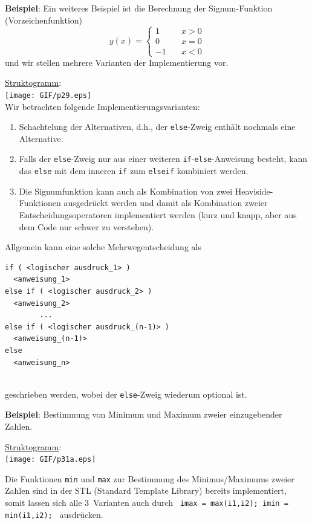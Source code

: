 \textbf{Beispiel}: Ein weiteres Beispiel ist die Berechnung
der Signum-Funktion (Vorzeichenfunktion)
$$
 y(x) = \begin{cases} 1 & \quad x > 0 \\ 0 & \quad x = 0 \\ -1 & \quad x < 0 \end{cases}
$$
und wir stellen mehrere Varianten der Implementierung vor.
\label{bsp:sgn1}

\underline{Struktogramm}:\\
%
\texttt{[image: GIF/p29.eps]}
\\
%
Wir betrachten folgende Implementierungsvarianten:
\begin{enumerate}
	\renewcommand{\labelenumi}{\alph{enumi})}
	\item Schachtelung der Alternativen, d.h., der \verb|else|-Zweig enthält nochmals
	  eine Alternative.
	\item Falls der \verb|else|-Zweig nur aus einer
        weiteren \verb|if|-\verb|else|-Anweisung besteht, kann das  \verb|else| mit
        dem inneren \verb|if| zum \verb|elseif| kombiniert werden.
    \item Die Signumfunktion kann auch als Kombination von  zwei Heaviside-Funktionen
    ausgedrückt werden und damit als Kombination zweier Entscheidungsoperatoren
    implementiert werden (kurz und knapp, aber aus dem Code nur schwer zu verstehen).
\end{enumerate}
%
%

\begin{samepage}
Allgemein kann eine solche Mehrwegentscheidung als
\\[1ex]
\mbox{}\hfill
\begin{minipage}[t]{0.7\textwidth}
\begin{verbatim}
if ( <logischer ausdruck_1> )
  <anweisung_1>
else if ( <logischer ausdruck_2> )
  <anweisung_2>
        ...
else if ( <logischer ausdruck_(n-1)> )
  <anweisung_(n-1)>
else
  <anweisung_n>
\end{verbatim}
\end{minipage}
\hfill\mbox{}\label{mehrweg}
\\[1ex]
geschrieben werden, wobei der \verb|else|-Zweig wiederum optional ist.
\end{samepage}

\pagebreak{}
\begin{samepage}
\textbf{Beispiel}: Bestimmung von Minimum und Maximum
zweier einzugebender Zahlen.

\underline{Struktogramm}: \\
\texttt{[image: GIF/p31a.eps]}
\end{samepage}
%
Die Funktionen \texttt{min} und \texttt{max} zur Bestimmung des Minimus/Maximums zweier Zahlen
sind in der STL (Standard Template Library) bereits implementiert,
somit lassen sich alle 3~Varianten auch durch
\verb| imax = max(i1,i2); imin = min(i1,i2); |
ausdrücken.


